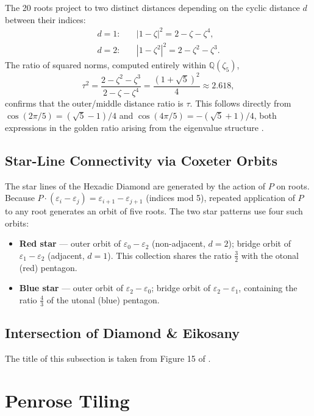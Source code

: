 \documentclass[11pt]{article}
\begin{document}
The 20 roots project to two distinct distances depending on the cyclic distance
$d$ between their indices:
\begin{align*}
  d=1: \quad &|1 - \zeta|^2 = 2 - \zeta - \zeta^4, \\
  d=2: \quad &|1 - \zeta^2|^2 = 2 - \zeta^2 - \zeta^3.
\end{align*}
The ratio of squared norms, computed entirely within $\mathbb{Q}(\zeta_5)$,
\[
  \tau^2 = \frac{2 - \zeta^2 - \zeta^3}{2 - \zeta - \zeta^4}
         = \frac{(1+\sqrt{5})^2}{4} \approx 2.618,
\]
confirms that the outer/middle distance ratio is $\tau$. This follows directly
from $\cos(2\pi/5) = (\sqrt{5}-1)/4$ and $\cos(4\pi/5) = -(\sqrt{5}+1)/4$,
both expressions in the golden ratio arising from the eigenvalue structure
\cite{senechal1995}.

\subsection{Star-Line Connectivity via Coxeter Orbits}

The star lines of the Hexadic Diamond are generated by the action of $P$ on
roots. Because $P \cdot (\varepsilon_i - \varepsilon_j) = \varepsilon_{i+1} -
\varepsilon_{j+1}$ (indices mod 5), repeated application of $P$ to any root
generates an orbit of five roots. The two star patterns use four such orbits:

\begin{itemize}
  \item \textbf{Red star} --- outer orbit of $\varepsilon_0 - \varepsilon_2$
        (non-adjacent, $d=2$); bridge orbit of $\varepsilon_1 - \varepsilon_2$
        (adjacent, $d=1$). This collection shares the ratio $\frac{3}{2}$ with the otonal (red) pentagon.
  \item \textbf{Blue star} --- outer orbit of $\varepsilon_2 - \varepsilon_0$;
        bridge orbit of $\varepsilon_2 - \varepsilon_1$, containing the ratio $\frac{4}{3}$ of the utonal (blue) pentagon.
\end{itemize}

\color{black}

\subsection{Intersection of Diamond \& Eikosany}

The title of this subsection is taken from Figure 15 of \cite{wilson1989}.

\section{Penrose Tiling}
\end{document}
